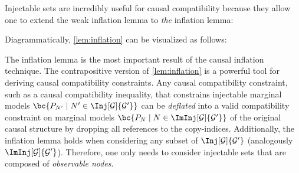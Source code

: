 \documentclass[aps, 10pt, english, twoside, pra, nofootinbib, tightenlines, longbibliography, superscriptaddress]{revtex4-1}
\begin{document}
    Injectable sets are incredibly useful for causal compatibility because they allow one to extend the weak inflation lemma to \textit{the} inflation lemma:
    Diagrammatically, \cref{lem:inflation} can be visualized as follows:

    \begin{center}
    \end{center}

    The inflation lemma is the most important result of the causal inflation technique. The contrapositive version of \cref{lem:inflation} is a powerful tool for deriving causal compatibility constraints. Any causal compatibility constraint, such as a causal compatibility inequality, that constrains injectable marginal models $\bc{\prob[N'] \mid N' \in \Inj[\graph]{\graph'}}$ can be \textit{deflated} into a valid compatibility constraint on marginal models $\bc{\prob[N] \mid N \in \ImInj[\graph]{\graph'}}$ of the original causal structure by dropping all references to the copy-indices. Additionally, the inflation lemma holds when considering any subset of $\Inj[\graph]{\graph'}$ (analogously $\ImInj[\graph]{\graph'}$). Therefore, one only needs to consider injectable sets that are composed of \textit{observable nodes}.
\end{document}
